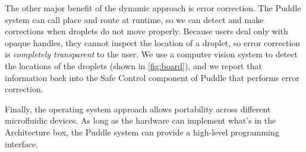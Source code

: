 \documentclass[
  10pt,
  a4paper,
  twocolumn,
]{article}
\begin{document}
The other major benefit of the dynamic approach is error correction.
The Puddle system can call place and route at runtime, so we can detect and make corrections when droplets do not move properly.
Because users deal only with opaque handles, they cannot inspect the location of a droplet, so error correction is \emph{completely transparent} to the user.
We use a computer vision system to detect the locations of the droplets (shown in \autoref{fig:board}), and we report that information back into the \textsf{Safe Control} component of Puddle that performs error correction.

Finally, the operating system approach allows portability across different microfluidic devices.
As long as the hardware can implement what's in the \textsf{Architecture} box, the Puddle system can provide a high-level programming interface.




\vfill

\renewcommand*{\bibfont}{\footnotesize}
\printbibliography[heading=none]
\end{document}
